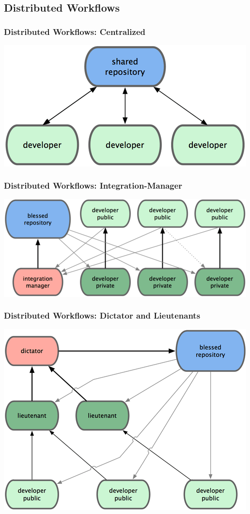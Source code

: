 \documentclass[english,compress]{beamer}
\begin{document}
\subsection{Distributed Workflows}
\frame
{
    \frametitle{Distributed Workflows: Centralized}

    \begin{center}
        \includegraphics[width=.7\textwidth]{figs/centralized-workflow.png}\cite{book}
    \end{center}
}

\frame
{
    \frametitle{Distributed Workflows: Integration-Manager}

    \begin{center}
        \includegraphics[width=.7\textwidth]{figs/integration-manager-workflow.png}\cite{book}
    \end{center}

}

\frame
{
    \frametitle{Distributed Workflows: Dictator and Lieutenants}

    \begin{center}
        \includegraphics[width=.7\textwidth]{figs/dictator-lieutenant-workflow.png}\cite{book}
    \end{center}

}
\end{document}
